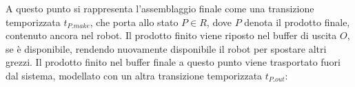 \documentclass{article}
\numberwithin{equation}{subsection}
\begin{document}
\begin{center}
\end{center}

A questo 
punto si rappresenta l'assemblaggio finale come una transizione temporizzata $t_{P.make}$, che porta allo stato $P\in R$, dove $P$ denota il prodotto finale, contenuto ancora 
nel robot. Il prodotto finito viene riposto nel buffer di uscita $O$, se è disponibile, rendendo nuovamente disponibile il robot per spostare altri grezzi. Il prodotto finito 
nel buffer finale a questo punto viene trasportato fuori dal sistema, modellato con un altra transizione temporizzata $t_{P.out}$:
\end{document}
